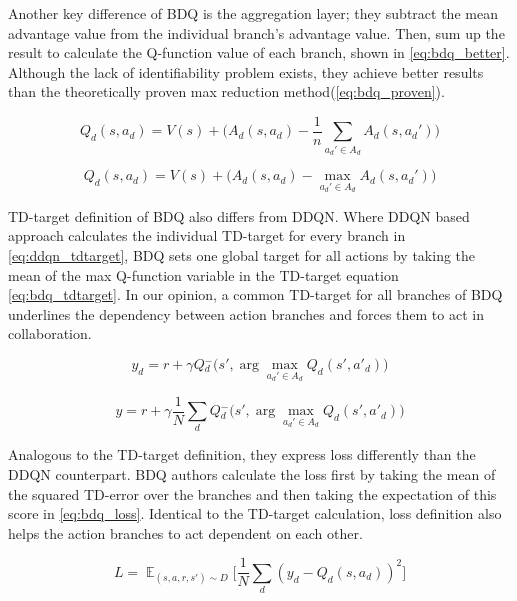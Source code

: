 Another key difference of BDQ is the aggregation layer; they subtract the mean advantage value from the individual branch's advantage value. Then, sum up the result to calculate the Q-function value of each branch, shown in \ref{eq:bdq_better}. Although the lack of identifiability problem exists, they achieve better results than the theoretically proven max reduction method(\ref{eq:bdq_proven}).

\begin{equation}
    Q_d(s, a_d) = V(s) + \Big(A_d(s, a_d) - \frac{1}{n} \sum\limits_{a_d'\in A_d}A_d(s, a_d')\Big)
    \label{eq:bdq_better}
\end{equation}


\begin{equation}
    Q_d(s, a_d) = V(s) + \Big(A_d(s, a_d) - \max\limits_{a_d'\in A_d}A_d(s, a_d')\Big)
    \label{eq:bdq_proven}
\end{equation}


TD-target definition of BDQ also differs from DDQN. Where DDQN based approach calculates the individual TD-target for every branch in \ref{eq:ddqn_tdtarget}, BDQ sets one global target for all actions by taking the mean of the max Q-function variable in the TD-target equation \ref{eq:bdq_tdtarget}. In our opinion, a common TD-target for all branches of BDQ underlines the dependency between action branches and forces them to act in collaboration.

\begin{equation}
    y_d = r + \gamma Q{_d^-}\Big(s', \arg\max\limits_{a_d'\in A_d}Q_d(s', a'_d)\Big)
    \label{eq:ddqn_tdtarget}
\end{equation}

\begin{equation}
    y = r + \gamma \frac{1}{N} \sum\limits_d Q{_d^-}\Big(s', \arg\max\limits_{a_d'\in A_d}Q_d(s', a'_d)\Big)
    \label{eq:bdq_tdtarget}
\end{equation}


Analogous to the TD-target definition, they express loss differently than the DDQN counterpart. BDQ authors calculate the loss first by taking the mean of the squared TD-error over the branches and then taking the expectation of this score in \ref{eq:bdq_loss}. Identical to the TD-target calculation, loss definition also helps the action branches to act dependent on each other.

\begin{equation}
    L = \mathop{\mathbb{E}}_{(s,a,r,s')\sim D} \Big[\frac{1}{N}\sum\limits_d(y_d-Q_d(s,a_d))^2]
    \label{eq:bdq_loss}
\end{equation}

